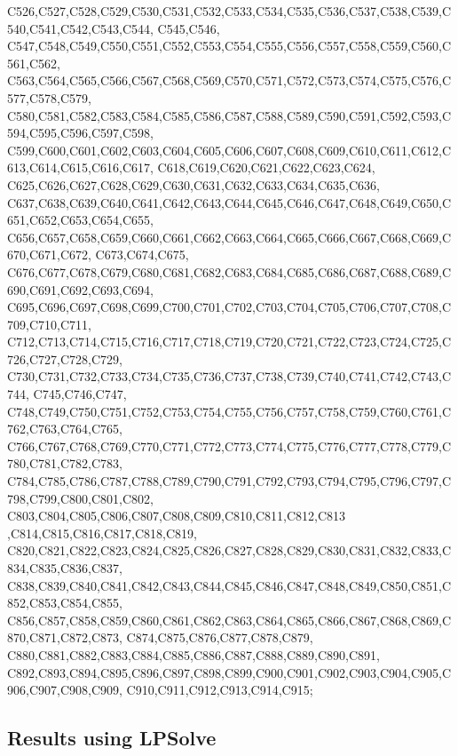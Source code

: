 C526,C527,C528,C529,C530,C531,C532,C533,C534,C535,C536,C537,C538,C539,C540,C541,C542,C543,C544,
C545,C546, C547,C548,C549,C550,C551,C552,C553,C554,C555,C556,C557,C558,C559,C560,C561,C562, C563,C564,C565,C566,C567,C568,C569,C570,C571,C572,C573,C574,C575,C576,C577,C578,C579,
C580,C581,C582,C583,C584,C585,C586,C587,C588,C589,C590,C591,C592,C593,C594,C595,C596,C597,C598,
C599,C600,C601,C602,C603,C604,C605,C606,C607,C608,C609,C610,C611,C612,C613,C614,C615,C616,C617,
C618,C619,C620,C621,C622,C623,C624, C625,C626,C627,C628,C629,C630,C631,C632,C633,C634,C635,C636,
C637,C638,C639,C640,C641,C642,C643,C644,C645,C646,C647,C648,C649,C650,C651,C652,C653,C654,C655,
C656,C657,C658,C659,C660,C661,C662,C663,C664,C665,C666,C667,C668,C669,C670,C671,C672, C673,C674,C675,
C676,C677,C678,C679,C680,C681,C682,C683,C684,C685,C686,C687,C688,C689,C690,C691,C692,C693,C694,
C695,C696,C697,C698,C699,C700,C701,C702,C703,C704,C705,C706,C707,C708,C709,C710,C711, C712,C713,C714,C715,C716,C717,C718,C719,C720,C721,C722,C723,C724,C725,C726,C727,C728,C729,
C730,C731,C732,C733,C734,C735,C736,C737,C738,C739,C740,C741,C742,C743,C744, C745,C746,C747,
C748,C749,C750,C751,C752,C753,C754,C755,C756,C757,C758,C759,C760,C761,C762,C763,C764,C765, C766,C767,C768,C769,C770,C771,C772,C773,C774,C775,C776,C777,C778,C779,C780,C781,C782,C783, C784,C785,C786,C787,C788,C789,C790,C791,C792,C793,C794,C795,C796,C797,C798,C799,C800,C801,C802,
C803,C804,C805,C806,C807,C808,C809,C810,C811,C812,C813 ,C814,C815,C816,C817,C818,C819,
C820,C821,C822,C823,C824,C825,C826,C827,C828,C829,C830,C831,C832,C833,C834,C835,C836,C837, C838,C839,C840,C841,C842,C843,C844,C845,C846,C847,C848,C849,C850,C851,C852,C853,C854,C855, C856,C857,C858,C859,C860,C861,C862,C863,C864,C865,C866,C867,C868,C869,C870,C871,C872,C873,
C874,C875,C876,C877,C878,C879, C880,C881,C882,C883,C884,C885,C886,C887,C888,C889,C890,C891,
C892,C893,C894,C895,C896,C897,C898,C899,C900,C901,C902,C903,C904,C905,C906,C907,C908,C909,
C910,C911,C912,C913,C914,C915;


\subsection{Results using LPSolve}


